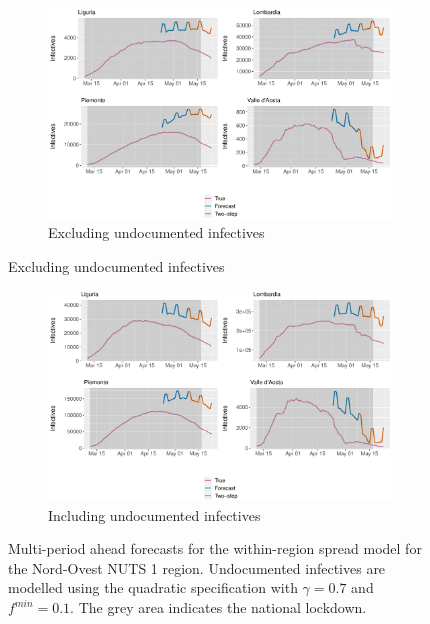 \documentclass[12pt]{article}
\begin{document}
	\begin{figure}[H]
	    \centering
	    \begin{subfigure}{\textwidth}
	      \centering
	      \includegraphics[width=0.92\linewidth]{output/model_within_lag14_forecast_full_Nord-Ovest.pdf}
	      \caption{Excluding undocumented infectives}
	      \label{fig:forecast_full_within_nordovest_regular}
	    \end{subfigure}
    \end{figure}
    \begin{figure}[H]\ContinuedFloat
	    \begin{subfigure}{\textwidth}
	      \centering
	      \includegraphics[width=0.92\linewidth]{output/model_within_lag14_forecast_full_Nord-Ovest_UndocQuadratic.pdf}
	      \caption{Including undocumented infectives}
	      \label{fig:forecast_full_within_nordovest_undoc}
	    \end{subfigure}
	    \caption{Multi-period ahead forecasts for the within-region spread model for the Nord-Ovest NUTS 1 region. Undocumented infectives are modelled using the quadratic specification with $\gamma = 0.7$ and $f^{min}=0.1$. The grey area indicates the national lockdown.}
	    \label{fig:forecast_full_within_nordovest}
    \end{figure}
    
\end{document}
